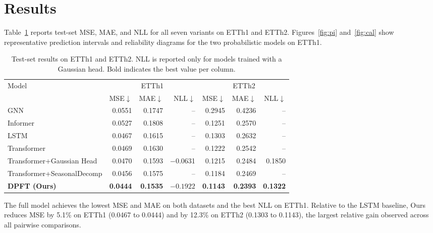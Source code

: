 \documentclass[runningheads]{llncs}
\begin{document}
\section{Results}

Table~\ref{tab:ablation} reports test-set MSE, MAE, and NLL for all seven variants
on ETTh1 and ETTh2.
Figures~\ref{fig:pi} and~\ref{fig:cal} show representative prediction intervals and
reliability diagrams for the two probabilistic models on ETTh1.

\begin{table}[t]
\caption{Test-set results on ETTh1 and ETTh2. NLL is reported only for models
trained with a Gaussian head. Bold indicates the best value per column.}
\label{tab:ablation}
\centering
\small
\begin{tabular}{lrrrrrr}
\toprule
Model
  & \multicolumn{3}{c}{ETTh1}
  & \multicolumn{3}{c}{ETTh2} \\
\cmidrule(lr){2-4}\cmidrule(lr){5-7}
  & MSE$\downarrow$ & MAE$\downarrow$ & NLL$\downarrow$
  & MSE$\downarrow$ & MAE$\downarrow$ & NLL$\downarrow$ \\
\midrule
GNN                        & 0.0551 & 0.1747 & --       & 0.2945 & 0.4236 & -- \\
Informer                   & 0.0527 & 0.1808 & --       & 0.1251 & 0.2570 & -- \\
LSTM                       & 0.0467 & 0.1615 & --       & 0.1303 & 0.2632 & -- \\
Transformer                & 0.0469 & 0.1630 & --       & 0.1222 & 0.2542 & -- \\
Transformer+Gaussian Head  & 0.0470 & 0.1593 & $-$0.0631 & 0.1215 & 0.2484 & 0.1850 \\
Transformer+SeasonalDecomp & 0.0456 & 0.1575 & --       & 0.1184 & 0.2469 & -- \\
\textbf{DPFT (Ours)}       & \textbf{0.0444} & \textbf{0.1535} & $\mathbf{-0.1922}$
                           & \textbf{0.1143} & \textbf{0.2393} & \textbf{0.1322} \\
\bottomrule
\end{tabular}
\end{table}

The full model achieves the lowest MSE and MAE on both datasets and the best NLL
on ETTh1.
Relative to the LSTM baseline, Ours reduces MSE by 5.1\% on ETTh1 (0.0467 to 0.0444)
and by 12.3\% on ETTh2 (0.1303 to 0.1143), the largest relative gain observed
across all pairwise comparisons.
\end{document}
